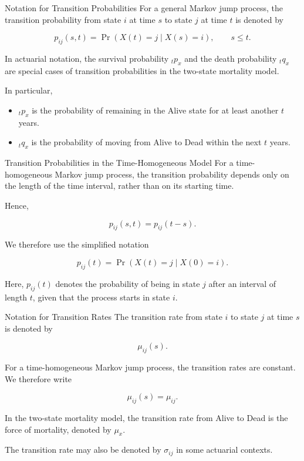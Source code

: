 \documentclass[
  ignorenonframetext,
  aspectratio=169,
]{beamer}
\providecommand{\tightlist}{%
  \setlength{\itemsep}{0pt}\setlength{\parskip}{0pt}}
\begin{document}
\begin{frame}{Notation for Transition Probabilities}
\protect{}\label{notation-for-transition-probabilities}
For a general Markov jump process, the transition probability from state
\(i\) at time \(s\) to state \(j\) at time \(t\) is denoted by

\[
p_{ij}(s,t)
=
\Pr(X(t)=j\mid X(s)=i),
\qquad s\leq t.
\]

In actuarial notation, the survival probability \({}_t p_x\) and the
death probability \({}_t q_x\) are special cases of transition
probabilities in the two-state mortality model.

In particular,

\begin{itemize}
\tightlist
\item
  \({}_t p_x\) is the probability of remaining in the Alive state for at
  least another \(t\) years.
\item
  \({}_t q_x\) is the probability of moving from Alive to Dead within
  the next \(t\) years.
\end{itemize}
\end{frame}

\begin{frame}{Transition Probabilities in the Time-Homogeneous Model}
\protect{}\label{transition-probabilities-in-the-time-homogeneous-model}
For a time-homogeneous Markov jump process, the transition probability
depends only on the length of the time interval, rather than on its
starting time.

Hence,

\[
p_{ij}(s,t)=p_{ij}(t-s).
\]

We therefore use the simplified notation

\[
p_{ij}(t)
=
\Pr(X(t)=j\mid X(0)=i).
\]

Here, \(p_{ij}(t)\) denotes the probability of being in state \(j\)
after an interval of length \(t\), given that the process starts in
state \(i\).
\end{frame}

\begin{frame}{Notation for Transition Rates}
\protect{}\label{notation-for-transition-rates}
The transition rate from state \(i\) to state \(j\) at time \(s\) is
denoted by

\[
\mu_{ij}(s).
\]

For a time-homogeneous Markov jump process, the transition rates are
constant. We therefore write

\[
\mu_{ij}(s)=\mu_{ij}.
\]

In the two-state mortality model, the transition rate from Alive to Dead
is the force of mortality, denoted by \(\mu_x\).

The transition rate may also be denoted by \(\sigma_{ij}\) in some
actuarial contexts.
\end{frame}
\end{document}
